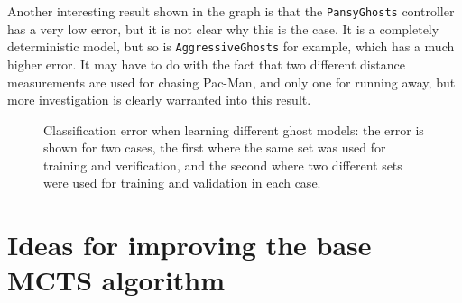 Another interesting result shown in the graph is that the {\tt PansyGhosts} controller has a very low error, but it is not clear why this is the case.  It is a completely deterministic model, but so is {\tt AggressiveGhosts} for example, which has a much higher error.  It may have to do with the fact that two different distance measurements are used for chasing Pac-Man, and only one for running away, but more investigation is clearly warranted into this result.

\begin{figure}
\centering
{}
\caption[Classification error when learning different ghost models]{Classification error when learning different ghost models: the error is shown for two cases, the first where the same set was used for training and verification, and the second where two different sets were used for training and validation in each case.}
\label{fig:resultsclasserror}
\end{figure}


\section{Ideas for improving the base MCTS algorithm}
\label{sec:maastricht}


